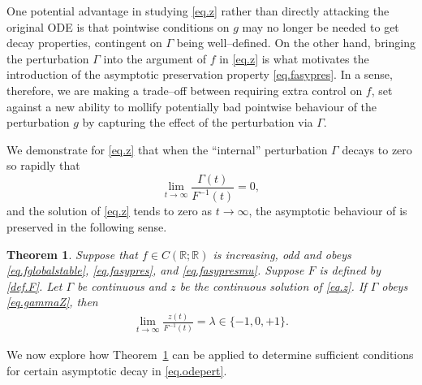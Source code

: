 \documentclass[a4paper,10pt,reqno]{amsart}
\numberwithin{equation}{section}
\newtheorem{theorem}{Theorem}
\theoremstyle{definition}
\theoremstyle{remark}
\DeclareMathOperator{\1}{\mathbbm 1}
\begin{document}
	One potential advantage in studying \eqref{eq.z} rather than directly attacking the original ODE is that pointwise conditions on $g$ may no longer be needed to get decay properties, contingent on $\Gamma$ being well--defined. On the other hand, bringing the perturbation $\Gamma$ into the argument of $f$ in \eqref{eq.z} is what motivates the introduction of the asymptotic preservation property \eqref{eq.fasypres}. In a sense, therefore, we are making a trade--off between requiring extra control on $f$, set against a new ability to mollify potentially bad pointwise behaviour of the perturbation $g$ by capturing the effect of the perturbation via $\Gamma$.
	
	We demonstrate for \eqref{eq.z} that when the ``internal'' perturbation $\Gamma$ decays to zero so rapidly that 
	\begin{equation} \label{eq.gammaZ}
		\lim_{t\to\infty} \frac{\Gamma(t)}{F^{-1}(t)}=0,
	\end{equation}
	and the solution of \eqref{eq.z} tends to zero as $t\to\infty$, the asymptotic behaviour of  is preserved in the following sense.
	\begin{theorem} \label{thm.ThZ}
		Suppose that $f\in C(\mathbb{R};\mathbb{R})$ is increasing, odd and obeys \eqref{eq.fglobalstable}, \eqref{eq.fasypres}, and \eqref{eq.fasypresmu}. Suppose $F$ is defined by \eqref{def.F}.   Let $\Gamma$ be continuous and $z$ be the continuous solution of \eqref{eq.z}. 
		If $\Gamma$ obeys \eqref{eq.gammaZ}, then  
		\begin{align*}
			\lim_{t \to \infty} \frac{z(t)}{F^{-1}(t)} =\lambda\in \{-1,0,+1\}.
		\end{align*}
	\end{theorem}
	We now explore how Theorem~\ref{thm.ThZ} can be applied to determine sufficient conditions for certain asymptotic decay in \eqref{eq.odepert}. 
\end{document}

